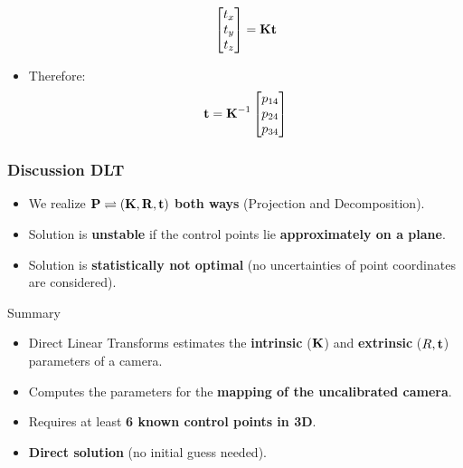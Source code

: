 \begin{frame}
\begin{itemize}
\begin{equation*}
\begin{bmatrix}
          t_x \\
          t_y \\
          t_z
      \end{bmatrix} = \boldsymbol{\mathbf{K}} \boldsymbol{\mathbf{t}}
    \end{equation*}
    \item Therefore:
    \begin{equation*}
      \boldsymbol{\mathbf{t}} = \boldsymbol{\mathbf{K}}^{-1}
      \begin{bmatrix}
          p_{14} \\
          p_{24} \\
          p_{34}
      \end{bmatrix}
    \end{equation*}
  \end{itemize}
\end{frame}

\begin{frame}
  \frametitle{Discussion DLT}
    \begin{itemize}
        \item We realize $\boldsymbol{\mathbf{P}} \rightleftharpoons (\boldsymbol{\mathbf{K}}, \boldsymbol{\mathbf{R}}, \boldsymbol{\mathbf{t}})$ \textbf{both ways} (Projection and Decomposition).
        \item Solution is \textbf{unstable} if the control points lie \textbf{approximately on a plane}.
        \item Solution is \textbf{statistically not optimal} (no uncertainties of point coordinates are considered).
    \end{itemize}
\end{frame}

\begin{frame}{Summary}
    \begin{itemize}
        \item Direct Linear Transforms estimates the \textbf{intrinsic} ($\boldsymbol{\mathbf{K}}$) and \textbf{extrinsic} ($R, \boldsymbol{\mathbf{t}}$) parameters of a camera.
        \item Computes the parameters for the \textbf{mapping of the uncalibrated camera}.
        \item Requires at least \textbf{6 known control points in 3D}.
        \item \textbf{Direct solution} (no initial guess needed).
    \end{itemize}
\end{frame}

